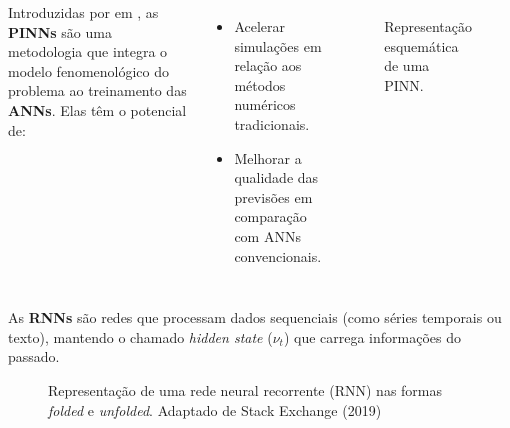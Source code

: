 \begin{frame}
  \begin{columns}
    Introduzidas por \citeauthor{raissi_2017_I} em , as \textbf{PINNs} são uma metodologia que integra o modelo fenomenológico do problema ao treinamento das \textbf{ANNs}. Elas têm o potencial de:

    \vspace{0.2cm}

    \begin{itemize}
      \item Acelerar simulações em relação aos métodos numéricos tradicionais.
      \item Melhorar a qualidade das previsões em comparação com ANNs convencionais.
    \end{itemize}

    \begin{figure}
      \centering
      {
      \resizebox{\textwidth}{!}{}}
      \caption{Representação esquemática de uma PINN.}
    \end{figure}
  \end{columns}
\end{frame}

\begin{frame}
  As \textbf{RNNs} são redes que processam dados sequenciais (como séries temporais ou texto), mantendo o chamado \textit{hidden state} ($\nu_t$) que carrega informações do passado.

  \vspace{0.4cm}

  \begin{figure}
    \centering
    \resizebox{0.8\textwidth}{!}{}
    \caption{Representação de uma rede neural recorrente (RNN) nas formas \textit{folded} e \textit{unfolded}. Adaptado de Stack Exchange (2019)}
  \end{figure}
\end{frame}

